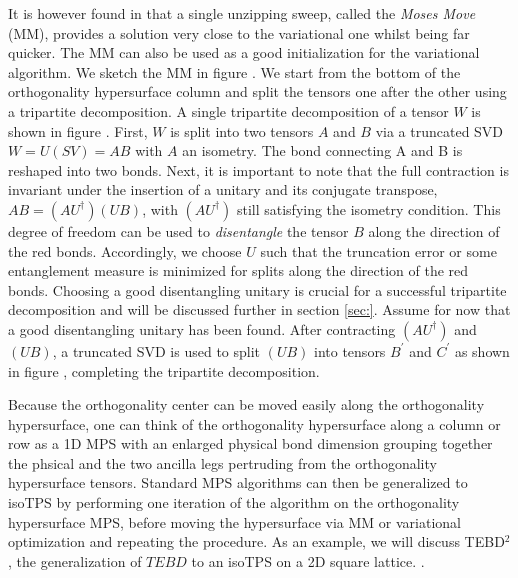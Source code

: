 It is however found in \cite{cite:isometric_tensor_network_states_in_two_dimensions} that a single unzipping sweep, called the \textit{Moses Move} (MM), provides a solution very close to the variational one whilst being far quicker. The MM can also be used as a good initialization for the variational algorithm. We sketch the MM in figure . We start from the bottom of the orthogonality hypersurface column and split the tensors one after the other using a tripartite decomposition. A single tripartite decomposition of a tensor $W$ is shown in figure . First, $W$ is split into two tensors $A$ and $B$ via a truncated SVD $W = U(SV) = AB$ with $A$ an isometry. The bond connecting A and B is reshaped into two bonds. Next, it is important to note that the full contraction is invariant under the insertion of a unitary and its conjugate transpose, $AB = (AU^\dagger)(UB)$, with $(AU^\dagger)$ still satisfying the isometry condition. This degree of freedom can be used to \textit{disentangle} the tensor $B$ along the direction of the red bonds. Accordingly, we choose $U$ such that the truncation error or some entanglement measure is minimized for splits along the direction of the red bonds. Choosing a good disentangling unitary is crucial for a successful tripartite decomposition and will be discussed further in section \ref{sec:}. Assume for now that a good disentangling unitary has been found. After contracting $(AU^\dagger)$ and $(UB)$, a truncated SVD is used to split $(UB)$ into tensors $B^\prime$ and $C^\prime$ as shown in figure , completing the tripartite decomposition. \par
Because the orthogonality center can be moved easily along the orthogonality hypersurface, one can think of the orthogonality hypersurface along a column or row as a 1D MPS with an enlarged physical bond dimension grouping together the phsical and the two ancilla legs pertruding from the orthogonality hypersurface tensors. Standard MPS algorithms can then be generalized to isoTPS by performing one iteration of the algorithm on the orthogonality hypersurface MPS, before moving the hypersurface via MM or variational optimization and repeating the procedure. As an example, we will discuss TEBD$^2$, the generalization of $TEBD$ to an isoTPS on a 2D square lattice. . \par
